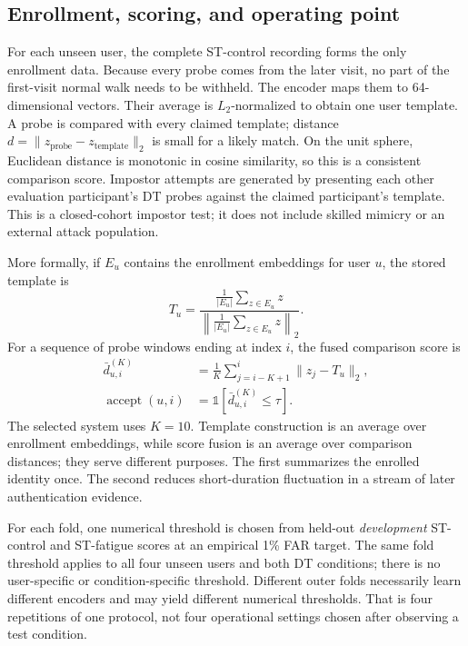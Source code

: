 \documentclass[conference]{IEEEtran}
\begin{document}
\subsection{Enrollment, scoring, and operating point}
For each unseen user, the complete ST-control recording forms the only enrollment data. Because every probe comes from the later visit, no part of the first-visit normal walk needs to be withheld. The encoder maps them to 64-dimensional vectors. Their average is $L_2$-normalized to obtain one user template. A probe is compared with every claimed template; distance $d=\|z_{\mathrm{probe}}-z_{\mathrm{template}}\|_2$ is small for a likely match. On the unit sphere, Euclidean distance is monotonic in cosine similarity, so this is a consistent comparison score. Impostor attempts are generated by presenting each other evaluation participant's DT probes against the claimed participant's template. This is a closed-cohort impostor test; it does not include skilled mimicry or an external attack population.

More formally, if $E_u$ contains the enrollment embeddings for user $u$, the stored template is
\begin{equation}
T_u=\frac{\frac{1}{|E_u|}\sum_{z\in E_u}z}{\left\|\frac{1}{|E_u|}\sum_{z\in E_u}z\right\|_2}.
\end{equation}
For a sequence of probe windows ending at index $i$, the fused comparison score is
\begin{align}
\bar d_{u,i}^{(K)}&=\frac{1}{K}\sum_{j=i-K+1}^{i}\|z_j-T_u\|_2,\\
\operatorname{accept}(u,i)&=\mathbb{1}\!\left[\bar d_{u,i}^{(K)}\le\tau\right].
\end{align}
The selected system uses $K=10$. Template construction is an average over enrollment embeddings, while score fusion is an average over comparison distances; they serve different purposes. The first summarizes the enrolled identity once. The second reduces short-duration fluctuation in a stream of later authentication evidence.

For each fold, one numerical threshold is chosen from held-out \emph{development} ST-control and ST-fatigue scores at an empirical 1\% FAR target. The same fold threshold applies to all four unseen users and both DT conditions; there is no user-specific or condition-specific threshold. Different outer folds necessarily learn different encoders and may yield different numerical thresholds. That is four repetitions of one protocol, not four operational settings chosen after observing a test condition.
\end{document}
